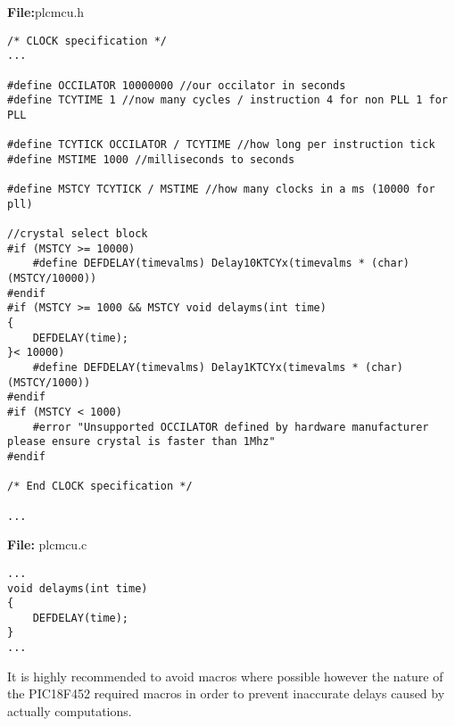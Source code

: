 \textbf{File:}plcmcu.h
\begin{minipage}{\textwidth}
\begin{lstlisting}[frame=single]
/* CLOCK specification */
...

#define OCCILATOR 10000000 //our occilator in seconds
#define TCYTIME 1 //now many cycles / instruction 4 for non PLL 1 for PLL 

#define TCYTICK OCCILATOR / TCYTIME //how long per instruction tick
#define MSTIME 1000 //milliseconds to seconds

#define MSTCY TCYTICK / MSTIME //how many clocks in a ms (10000 for pll)

//crystal select block
#if (MSTCY >= 10000)
	#define DEFDELAY(timevalms) Delay10KTCYx(timevalms * (char) (MSTCY/10000))
#endif
#if (MSTCY >= 1000 && MSTCY void delayms(int time)
{
	DEFDELAY(time);
}< 10000)
	#define DEFDELAY(timevalms) Delay1KTCYx(timevalms * (char) (MSTCY/1000))
#endif
#if (MSTCY < 1000)
	#error "Unsupported OCCILATOR defined by hardware manufacturer please ensure crystal is faster than 1Mhz"
#endif

/* End CLOCK specification */

...
\end{lstlisting}
\end{minipage}

\textbf{File:} plcmcu.c
\begin{minipage}{\textwidth}
\begin{lstlisting}[frame=single]
...
void delayms(int time)
{
	DEFDELAY(time);
}
...
\end{lstlisting}
\end{minipage}

It is highly recommended to avoid macros where possible however the nature of the PIC18F452 required macros in order to prevent inaccurate delays caused by actually computations.